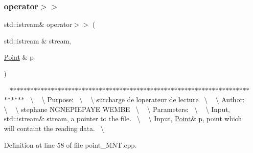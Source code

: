 \subsubsection{\texorpdfstring{operator$>$$>$}{operator>>}}
{\footnotesize\ttfamily std\+::istream\& operator$>$$>$ (\begin{DoxyParamCaption}\item[{std\+::istream \&}]{stream,  }\item[{\hyperlink{class_point}{Point} \&}]{p }\end{DoxyParamCaption})\hspace{0.3cm}{\ttfamily [friend]}}

~\newline
$\ast$$\ast$$\ast$$\ast$$\ast$$\ast$$\ast$$\ast$$\ast$$\ast$$\ast$$\ast$$\ast$$\ast$$\ast$$\ast$$\ast$$\ast$$\ast$$\ast$$\ast$$\ast$$\ast$$\ast$$\ast$$\ast$$\ast$$\ast$$\ast$$\ast$$\ast$$\ast$$\ast$$\ast$$\ast$$\ast$$\ast$$\ast$$\ast$$\ast$$\ast$$\ast$$\ast$$\ast$$\ast$$\ast$$\ast$$\ast$$\ast$$\ast$$\ast$$\ast$$\ast$$\ast$$\ast$$\ast$$\ast$$\ast$$\ast$$\ast$$\ast$$\ast$$\ast$$\ast$$\ast$$\ast$$\ast$$\ast$$\ast$$\ast$$\ast$$\ast$$\ast$$\ast$$\ast$$\ast$~\newline
\textbackslash{} ~\newline
\textbackslash{} Purpose\+:~\newline
\textbackslash{} ~\newline
\textbackslash{} surcharge de l\textquotesingle{}operateur de lecture~\newline
\textbackslash{} ~\newline
\textbackslash{} Author\+:~\newline
\textbackslash{} ~\newline
\textbackslash{} stephane N\+G\+N\+E\+P\+I\+E\+P\+A\+YE W\+E\+M\+BE~\newline
\textbackslash{} ~\newline
\textbackslash{} Parameters\+:~\newline
\textbackslash{} ~\newline
\textbackslash{} Input, std\+::istream\& stream, a pointer to the file.~\newline
\textbackslash{} ~\newline
\textbackslash{} Input, \hyperlink{class_point}{Point}\& p, point which will containt the reading data.~\newline
\textbackslash{} ~\newline


Definition at line 58 of file point\+\_\+\+M\+N\+T.\+cpp.



